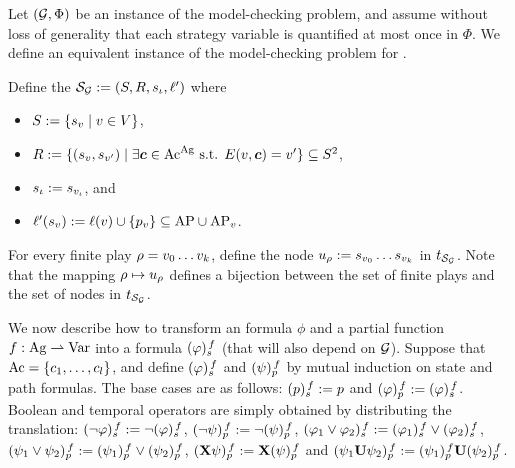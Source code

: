 Let $(\CGS,\Phi)$ be an instance of the \SL
model-checking problem, and assume without loss of generality that
each strategy variable is quantified at most once in $\Phi$. We define an equivalent instance of the
model-checking problem for \QCTLs.



Define the \KS $\KS_{\CGS}\egdef(\setstates,\relation,\sstate_{\init},\lab')$ where
\begin{itemize}
\item $\setstates\egdef\{\sstate_{\pos} \mid \pos\in\setpos\}$,
\item $\relation\egdef\{(\sstate_{\pos},\sstate_{\pos'})\mid
  \exists\jmov\in\Mov^{\Agf} \mbox{ s.t. }\trans(\pos,\jmov)=\pos'\}
  \subseteq \setstates^2$,
  \item $\sstate_{\init}\egdef\sstate_{\pos_{\init}}$, and
\item $\lab'(\sstate_{\pos})\egdef\val(\pos)\union \{p_{\pos}\} \subseteq \APf \cup \APv$.
\end{itemize}



For every finite play $\fplay=\pos_{0}\ldots\pos_{k}$, define
the node $\noeud_{\fplay}\egdef \sstate_{\pos_{0}}\ldots \sstate_{\pos_{k}}$ in
$\unfold[\KS_{\CGS}]{\sstate_{\pos_{0}}}$.  Note that the mapping
$\fplay\mapsto\noeud_{\fplay}$ defines a bijection between the set
of finite plays and the set of
nodes in $\unfold[\KS_{\CGS}]{\sstate_{\init}}$. %


\halfline
{}
 We now describe how to transform an \SLref formula $\phi$ and a partial
function $f:\Agf \partialto  \Varf$ into a \QCTLs
formula $\tr[f]{\phi}$ (that will also depend on $\CGS$).
Suppose that $\Mov=\{\mov_{1},\ldots,\mov_{\maxmov}\}$, and define
$\tr[f]{\phi}$ and $\trp[f]{\psi}$ by mutual induction on state and path formulas. 
The base cases are as follows:
$\tr[f]{p} 		 \egdef p$ and $\trp[f]{\phi} \egdef
\tr[f]{\phi}$. Boolean and temporal operators are simply obtained by
distributing the translation:
$\tr[f]{\neg \phi} 	 \egdef \neg \tr[f]{\phi}$, $\trp[f]{\neg
  \psi} \egdef \neg \trp[f]{\psi}$,
$\tr[f]{\phi_1\ou\phi_2}  \egdef \tr[f]{\phi_1}\ou\tr[f]{\phi_2}$,
$\trp[f]{\psi_1\ou\psi_2}  \egdef \trp[f]{\psi_1}\ou\trp[f]{\psi_2}$,
$\trp[f]{\X\psi}  \egdef \X\trp[f]{\psi}$ and $\trp[f]{\psi_1\until\psi_2}  \egdef \trp[f]{\psi_1}\until\trp[f]{\psi_2}$.


